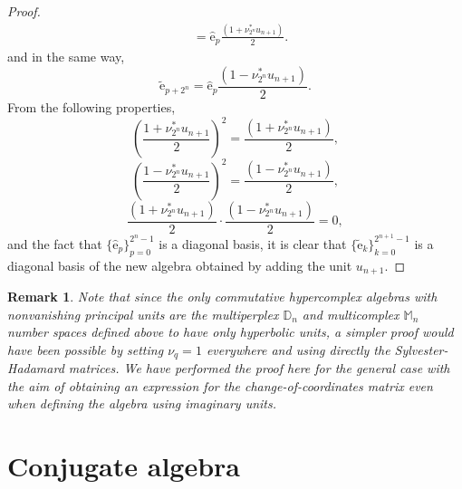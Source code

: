 \documentclass{article}
\newtheorem{remark}[theorem]{Remark}
\begin{document}
\begin{proof}
$$\begin{aligned}
        &= \hat{\mathrm e}_p \frac{(1 + \nu^*_{2^n} u_{n+1})}{2}.
    \end{aligned} $$
    and in the same way,
    $$ \tilde{\mathrm e}_{p + 2^n} = \hat{\mathrm e}_p \frac{(1 - \nu^*_{2^n} u_{n+1})}{2}. $$
        From the following properties,
        $$ \left( \frac{1 + \nu^*_{2^n} u_{n+1}}{2} \right)^2 = \frac{(1 + \nu^*_{2^n} u_{n+1})}{2}, $$
        $$ \left( \frac{1 - \nu^*_{2^n} u_{n+1}}{2} \right)^2 = \frac{(1 - \nu^*_{2^n} u_{n+1})}{2}, $$
        $$ \frac{(1 + \nu^*_{2^n} u_{n+1})}{2} \cdot \frac{(1 - \nu^*_{2^n} u_{n+1})}{2} = 0, $$
        and the fact that $\{ \hat{\mathrm e}_p \}_{p=0}^{2^n-1}$ is a diagonal basis, it is clear that $\{ \tilde{\mathrm e}_k \}_{k=0}^{2^{n+1}-1}$ is a diagonal basis of the new algebra obtained by adding the unit $u_{n+1}$.
\end{proof}
\begin{remark}
    Note that since the only commutative hypercomplex algebras with nonvanishing principal units are the multiperplex $\mathbb{D}_n$ and multicomplex $\mathbb{M}_n$ number spaces defined above to have only hyperbolic units, a simpler proof would have been possible by setting $\nu_q = 1$ everywhere and using directly the Sylvester-Hadamard matrices. We have performed the proof here for the general case with the aim of obtaining an expression for the change-of-coordinates matrix even when defining the algebra using imaginary units.
\end{remark}

\sloppy\section{Conjugate algebra}
\end{document}
